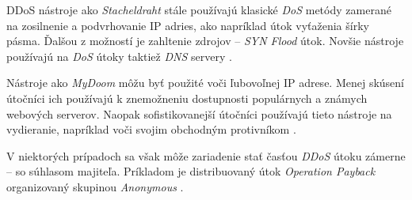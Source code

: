 \documentclass[
  printed, %
  table,   %
  lof,     %
  nolot,   %
  nocover
]{fithesis3}
\begin{document}
DDoS nástroje ako \textit{Stacheldraht} stále používajú klasické \textit{DoS} metódy zamerané na
zosilnenie a podvrhovanie IP adries, ako napríklad útok vyťaženia šírky pásma. Ďalšou z možností je
zahltenie zdrojov -- \textit{SYN Flood} útok. Novšie nástroje používajú na \textit{DoS} útoky taktiež
\textit{DNS} servery \cite{Dittrich:DoST}.

Nástroje ako \textit{MyDoom} môžu byť použité voči ľubovoľnej IP adrese. Menej skúsení útočníci ich
používajú k znemožneniu dostupnosti populárnych a známych webových serverov. Naopak sofistikovanejší
útočníci používajú tieto nástroje na vydieranie, napríklad voči svojim obchodným protivníkom \cite{Karami:2015:DoSaaS}.

V niektorých prípadoch sa však môže zariadenie stať časťou \textit{DDoS} útoku zámerne -- so súhlasom
majiteľa. Príkladom je distribuovaný útok \textit{Operation Payback} organizovaný skupinou
\textit{Anonymous} \cite{Leyden:2010:DoSaaS}.






\end{document}
